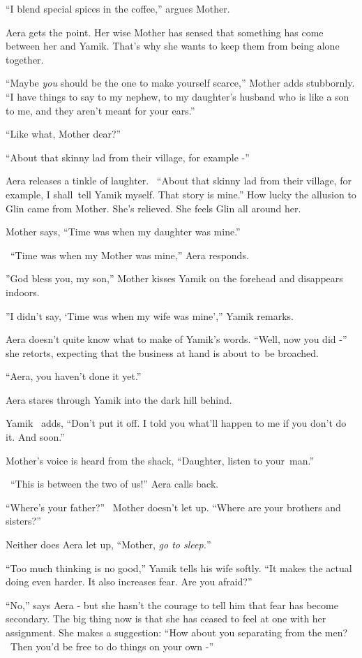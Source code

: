 \documentclass[twoside,11pt]{book}
\begin{document}
{}``I blend special spices in the coffee,'' argues Mother.

Aera gets the point. Her wise Mother has sensed that something has come between her and Yamik. That's why she wants to
keep them from being alone together.

{}``Maybe \textit{you} should be the one to make yourself scarce,'' Mother adds stubbornly. ``I have things to say to my
nephew, to my daughter's husband who is like a son to me, and they aren't meant for your ears.''

{}``Like what, Mother dear?''

{}``About that skinny{ }lad from their village, for example -''

Aera releases a tinkle of laughter. ~``About that skinny lad from their village, for example, I shall~tell Yamik myself.
That story is mine.'' How lucky the allusion to Glin came from Mother. She's relieved. She feels Glin all around her.

Mother says, ``Time was when my daughter was mine.''

\ {}``Time was when my Mother was mine,'' Aera responds.

{}''God bless you, my son,'' Mother kisses Yamik on the forehead and disappears indoors.

{}''I didn't say, `Time was when my wife was mine','' Yamik remarks.

Aera doesn't quite know what to make of Yamik's words. ``Well, now you did{
-}{}'' she retorts, expecting that the business at hand is about to~be broached.

{}``Aera, you haven't done it yet.''~

Aera stares through Yamik into the dark hill behind.

Yamik \ adds, ``Don't put it off. I told you what'll happen to me if you don't do it. And soon.''

Mother's voice is heard from the shack, ``Daughter, listen to your~man.''

~``This is between the two of us!'' Aera calls back.

{}``Where's your father?'' ~Mother doesn't let up. ``Where{ }are your brothers
and sisters?''

Neither does Aera let up, ``Mother, \textit{go to sleep.}{}''

{}``Too much thinking is no good,'' Yamik tells his wife softly. ``It makes the actual doing
even harder. It also increases fear. Are you afraid?''

{}``No,'' says Aera -{ }but she hasn't the courage to tell him that fear has
become secondary. The big thing now is that she has ceased to feel at one with her assignment. She makes a suggestion:
``How about you separating from the men? \ Then you'd be free to do things on your own -''
\end{document}
